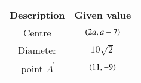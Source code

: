 \begin{tabular}{ |c| c|}
    \hline
    \textbf{Description}  & \textbf{ Given value}\\
    \hline
    Centre  & $\left(2a,a-7\right)$\\
    \hline
    Diameter & $10\sqrt{2}$\\
    \hline
    point $\vec{A}$ & $\left(11,-9\right)$\\
    \hline
\end{tabular}

